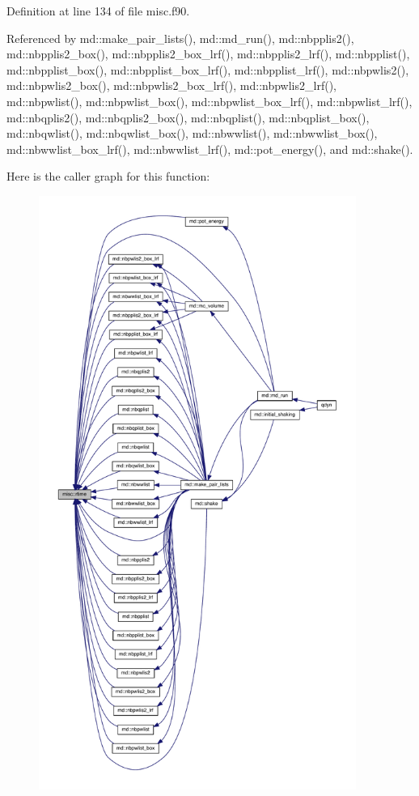 Definition at line 134 of file misc.\-f90.



Referenced by md\-::make\-\_\-pair\-\_\-lists(), md\-::md\-\_\-run(), md\-::nbpplis2(), md\-::nbpplis2\-\_\-box(), md\-::nbpplis2\-\_\-box\-\_\-lrf(), md\-::nbpplis2\-\_\-lrf(), md\-::nbpplist(), md\-::nbpplist\-\_\-box(), md\-::nbpplist\-\_\-box\-\_\-lrf(), md\-::nbpplist\-\_\-lrf(), md\-::nbpwlis2(), md\-::nbpwlis2\-\_\-box(), md\-::nbpwlis2\-\_\-box\-\_\-lrf(), md\-::nbpwlis2\-\_\-lrf(), md\-::nbpwlist(), md\-::nbpwlist\-\_\-box(), md\-::nbpwlist\-\_\-box\-\_\-lrf(), md\-::nbpwlist\-\_\-lrf(), md\-::nbqplis2(), md\-::nbqplis2\-\_\-box(), md\-::nbqplist(), md\-::nbqplist\-\_\-box(), md\-::nbqwlist(), md\-::nbqwlist\-\_\-box(), md\-::nbwwlist(), md\-::nbwwlist\-\_\-box(), md\-::nbwwlist\-\_\-box\-\_\-lrf(), md\-::nbwwlist\-\_\-lrf(), md\-::pot\-\_\-energy(), and md\-::shake().



Here is the caller graph for this function\-:
\nopagebreak
\begin{figure}[H]
\begin{center}
\leavevmode
\includegraphics[height=550pt]{classmisc_abd36d3dd3b5378bb78142330bd270555_icgraph}
\end{center}
\end{figure}


